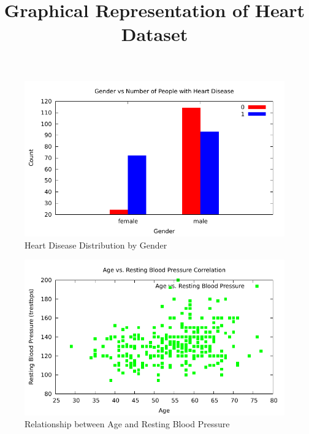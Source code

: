\documentclass{article}
\title{Graphical Representation of Heart Dataset}
\begin{document}
	\maketitle
	
	\begin{figure}[h]
		\centering
		\caption{\label{fig:gender_distribution}Heart Disease Distribution by Gender}
		\includegraphics[scale=0.7]{que4a.pdf}
	\end{figure}
	
	\begin{figure}[h]
		\centering
		\caption{\label{fig:age_bp_correlation}Relationship between Age and Resting Blood Pressure}
		\includegraphics[scale=0.7]{age_bp_correlation.pdf}
	\end{figure}
	
\end{document}
